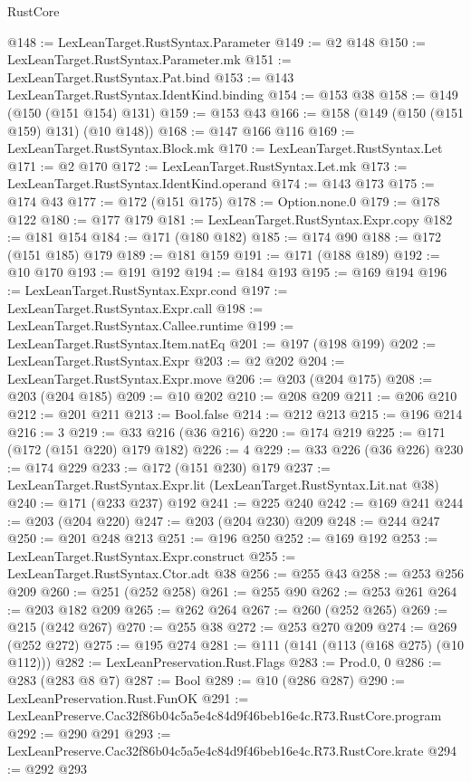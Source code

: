 \begin{lexlean}{RustCore}
\begin{coremodule}
@148 := LexLeanTarget.RustSyntax.Parameter
@149 := @2 @148
@150 := LexLeanTarget.RustSyntax.Parameter.mk
@151 := LexLeanTarget.RustSyntax.Pat.bind
@153 := @143 LexLeanTarget.RustSyntax.IdentKind.binding
@154 := @153 @38
@158 := @149 (@150 (@151 @154) @131)
@159 := @153 @43
@166 := @158 (@149 (@150 (@151 @159) @131) (@10 @148))
@168 := @147 @166 @116
@169 := LexLeanTarget.RustSyntax.Block.mk
@170 := LexLeanTarget.RustSyntax.Let
@171 := @2 @170
@172 := LexLeanTarget.RustSyntax.Let.mk
@173 := LexLeanTarget.RustSyntax.IdentKind.operand
@174 := @143 @173
@175 := @174 @43
@177 := @172 (@151 @175)
@178 := Option.none.{0}
@179 := @178 @122
@180 := @177 @179
@181 := LexLeanTarget.RustSyntax.Expr.copy
@182 := @181 @154
@184 := @171 (@180 @182)
@185 := @174 @90
@188 := @172 (@151 @185) @179
@189 := @181 @159
@191 := @171 (@188 @189)
@192 := @10 @170
@193 := @191 @192
@194 := @184 @193
@195 := @169 @194
@196 := LexLeanTarget.RustSyntax.Expr.cond
@197 := LexLeanTarget.RustSyntax.Expr.call
@198 := LexLeanTarget.RustSyntax.Callee.runtime
@199 := LexLeanTarget.RustSyntax.Item.natEq
@201 := @197 (@198 @199)
@202 := LexLeanTarget.RustSyntax.Expr
@203 := @2 @202
@204 := LexLeanTarget.RustSyntax.Expr.move
@206 := @203 (@204 @175)
@208 := @203 (@204 @185)
@209 := @10 @202
@210 := @208 @209
@211 := @206 @210
@212 := @201 @211
@213 := Bool.false
@214 := @212 @213
@215 := @196 @214
@216 := 3
@219 := @33 @216 (@36 @216)
@220 := @174 @219
@225 := @171 (@172 (@151 @220) @179 @182)
@226 := 4
@229 := @33 @226 (@36 @226)
@230 := @174 @229
@233 := @172 (@151 @230) @179
@237 := LexLeanTarget.RustSyntax.Expr.lit (LexLeanTarget.RustSyntax.Lit.nat @38)
@240 := @171 (@233 @237) @192
@241 := @225 @240
@242 := @169 @241
@244 := @203 (@204 @220)
@247 := @203 (@204 @230) @209
@248 := @244 @247
@250 := @201 @248 @213
@251 := @196 @250
@252 := @169 @192
@253 := LexLeanTarget.RustSyntax.Expr.construct
@255 := LexLeanTarget.RustSyntax.Ctor.adt @38
@256 := @255 @43
@258 := @253 @256 @209
@260 := @251 (@252 @258)
@261 := @255 @90
@262 := @253 @261
@264 := @203 @182 @209
@265 := @262 @264
@267 := @260 (@252 @265)
@269 := @215 (@242 @267)
@270 := @255 @38
@272 := @253 @270 @209
@274 := @269 (@252 @272)
@275 := @195 @274
@281 := @111 (@141 (@113 (@168 @275) (@10 @112)))
@282 := LexLeanPreservation.Rust.Flags
@283 := Prod.{0, 0}
@286 := @283 (@283 @8 @7)
@287 := Bool
@289 := @10 (@286 @287)
@290 := LexLeanPreservation.Rust.FunOK
@291 := LexLeanPreserve.Cac32f86b04c5a5e4c84d9f46beb16e4c.R73.RustCore.program
@292 := @290 @291
@293 := LexLeanPreserve.Cac32f86b04c5a5e4c84d9f46beb16e4c.R73.RustCore.krate
@294 := @292 @293

\end{coremodule}
\end{lexlean}
